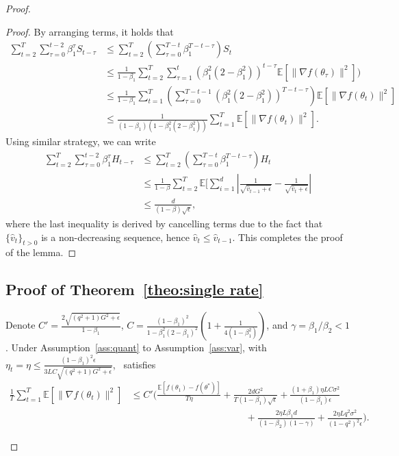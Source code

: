 \documentclass[11pt]{article}
\begin{document}
\begin{proof}
\begin{proof}
By arranging terms, it holds that
\begin{align*}
    \sum_{t=2}^T\sum_{\tau=0}^{t-2}\beta_1^\tau S_{t-\tau}&\leq \sum_{t=2}^T (\sum_{\tau=0}^{T-t} \beta_1^{T-t-\tau})S_t\\
    &\leq \frac{1}{1-\beta_1} \sum_{t=2}^T \sum_{\tau=1}^t (\beta_1^2(2-\beta_1^2))^{t-\tau}\mathbb E[\|\nabla f(\theta_\tau)\|^2])\\
    &\leq \frac{1}{1-\beta_1} \sum_{t=1}^T(\sum_{\tau=0}^{T-t-1}(\beta_1^2(2-\beta_1^2))^{T-t-\tau})\mathbb E[\|\nabla f(\theta_t)\|^2]\\
    &\leq \frac{1}{(1-\beta_1)(1-\beta_1^2(2-\beta_1^2))}\sum_{t=1}^T \mathbb E[\|\nabla f(\theta_t)\|^2].
\end{align*}
Using similar strategy, we can write
\begin{align*}
    \sum_{t=2}^T \sum_{\tau=0}^{t-2} \beta_1^\tau H_{t-\tau}&\leq \sum_{t=2}^T (\sum_{\tau=0}^{T-t} \beta_1^{T-t-\tau})H_t\\
    &\leq \frac{1}{1-\beta}\sum_{t=2}^T \mathbb E[\sum_{i=1}^d |\frac{1}{\sqrt{\hat v_{t-1}+\epsilon}}-\frac{1}{\sqrt{\hat v_t+\epsilon}}|\\
    &\leq \frac{d}{(1-\beta)\sqrt\epsilon},
\end{align*}
where the last inequality is derived by cancelling terms due to the fact that $\{\hat v_{t}\}_{t>0}$ is a non-decreasing sequence, hence $\hat v_{t}\leq \hat v_{t-1}$. This completes the proof of the lemma.
\end{proof}



\subsection{Proof of Theorem~\ref{theo:single rate}}


\begin{Theorem}  \label{theo:single rate}
Denote $C'=\frac{2\sqrt{(q^2+1)G^2+\epsilon}}{1-\beta_1}$, $C=\frac{(1-\beta_1)^2}{1-\beta_1^2(2-\beta_1)^2}(1+\frac{1}{4(1-\beta_1^2)})$, and $\gamma=\beta_1/\beta_2<1$. Under Assumption~\ref{ass:quant} to Assumption~\ref{ass:var}, with $\eta_t=\eta\leq \frac{(1-\beta_1)^2\epsilon}{3LC\sqrt{(q^2+1)G^2+\epsilon}}$, \algo\ satisfies
\begin{align*}
    \frac{1}{T}\sum_{t=1}^T \mathbb E[\|\nabla f(\theta_t)\|^2]&\leq C'\Big(\frac{\mathbb E[f(\theta_1)-f(\theta^*)]}{T\eta}+\frac{2dG^2}{T(1-\beta_1)\sqrt\epsilon}+\frac{(1+\beta_1)\eta LC\sigma^2}{(1-\beta_1)\epsilon}\\
    &\hspace{2in} +\frac{2\eta L\beta_1 d}{(1-\beta_2)(1-\gamma)}+\frac{2\eta L q^2\sigma^2}{(1-q^2)^2\epsilon}\Big).
\end{align*}


\end{Theorem}
\end{proof}
\end{document}

